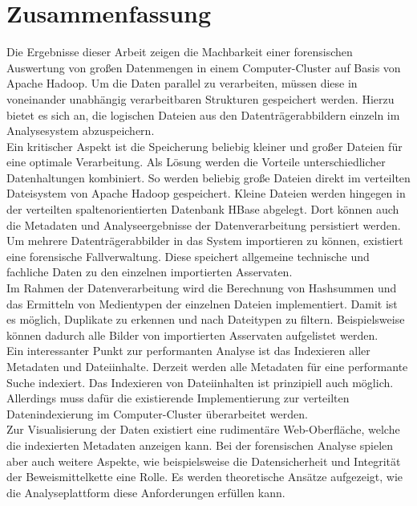 \chapter{Zusammenfassung}
\label{ch:zusammenfassung}

Die Ergebnisse dieser Arbeit zeigen die Machbarkeit einer forensischen Auswertung von großen Datenmengen in einem Computer-Cluster auf Basis von Apache Hadoop. Um die Daten parallel zu verarbeiten, müssen diese in voneinander unabhängig verarbeitbaren Strukturen gespeichert werden. Hierzu bietet es sich an, die logischen Dateien aus den Datenträgerabbildern einzeln im Analysesystem abzuspeichern.\\
Ein kritischer Aspekt ist die Speicherung beliebig kleiner und großer Dateien für eine optimale Verarbeitung. Als Lösung werden die Vorteile unterschiedlicher Datenhaltungen kombiniert. So werden beliebig große Dateien direkt im verteilten Dateisystem von Apache Hadoop gespeichert. Kleine Dateien werden hingegen in der verteilten spaltenorientierten Datenbank HBase abgelegt. Dort können auch die Metadaten und Analyseergebnisse der Datenverarbeitung persistiert werden.\\
Um mehrere Datenträgerabbilder in das System importieren zu können, existiert eine forensische Fallverwaltung. Diese speichert allgemeine technische und fachliche Daten zu den einzelnen importierten Asservaten.\\

\noindent
Im Rahmen der Datenverarbeitung wird die Berechnung von Hashsummen und das Ermitteln von Medientypen der einzelnen Dateien implementiert. Damit ist es möglich, Duplikate zu erkennen und nach Dateitypen zu filtern. Beispielsweise können dadurch alle Bilder von importierten Asservaten aufgelistet werden.\\
Ein interessanter Punkt zur performanten Analyse ist das Indexieren aller Metadaten und Dateiinhalte. Derzeit werden alle Metadaten für eine performante Suche indexiert. Das Indexieren von Dateiinhalten ist prinzipiell auch möglich. Allerdings  muss dafür die existierende Implementierung zur verteilten Datenindexierung im Computer-Cluster überarbeitet werden.\\

\noindent
Zur Visualisierung der Daten existiert eine rudimentäre Web-Oberfläche, welche die indexierten Metadaten anzeigen kann. Bei der forensischen Analyse spielen aber auch weitere Aspekte, wie beispielsweise die Datensicherheit und Integrität der Beweismittelkette eine Rolle. Es werden theoretische Ansätze aufgezeigt, wie die Analyseplattform diese Anforderungen erfüllen kann.\\

